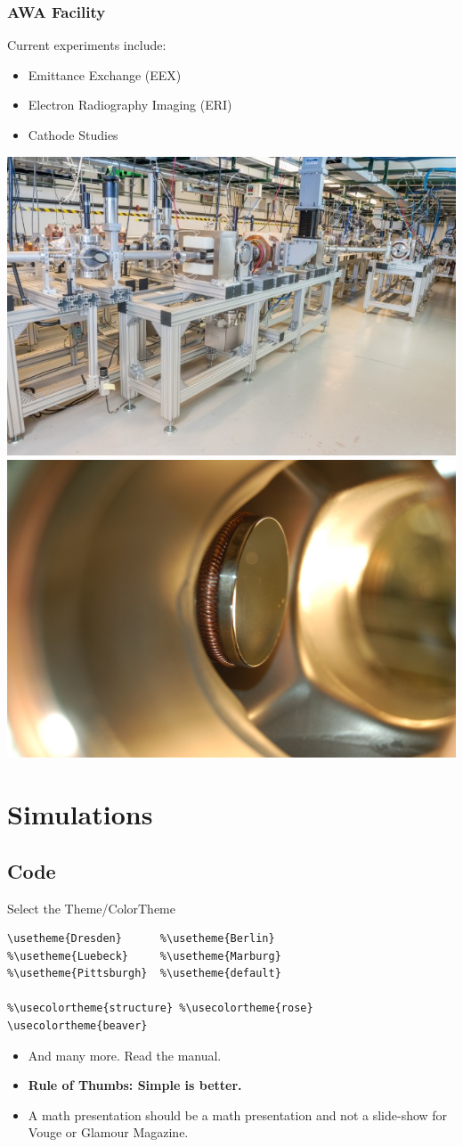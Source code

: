 \documentclass[professionalfonts,t]{beamer}
\begin{document}
\begin{frame}
	\frametitle{AWA Facility}
	\vspace{-1em}
Current experiments include:
\begin{itemize}
	\item{Emittance Exchange (EEX)}
	\item{Electron Radiography Imaging (ERI)}
	\item{Cathode Studies}
\end{itemize}
\vspace{0.3cm}
\centering
\includegraphics[width=0.5\linewidth]{../images/EEX}\includegraphics[width=0.5\linewidth]{../images/cathode1}
\end{frame}
\section{Simulations}
\subsection{Code}
\begin{frame}[containsverbatim]{Select the Theme/ColorTheme}
\begin{verbatim}
\usetheme{Dresden}      %\usetheme{Berlin}
%\usetheme{Luebeck}     %\usetheme{Marburg}
%\usetheme{Pittsburgh}  %\usetheme{default}

%\usecolortheme{structure} %\usecolortheme{rose}
\usecolortheme{beaver}
\end{verbatim}

\begin{itemize}
\item And many more. Read the manual.
\item {\bf Rule of Thumbs: Simple is better.}
\item A math presentation should be a math presentation and
not a slide-show for Vouge or Glamour Magazine.
\end{itemize}
\end{frame}
\end{document}
